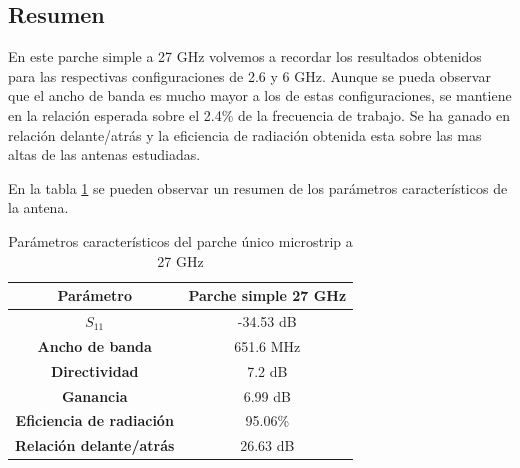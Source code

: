\subsection{Resumen}
\par En este parche simple a 27 GHz volvemos a recordar los resultados obtenidos para las respectivas configuraciones de 2.6 y 6 GHz. Aunque se pueda observar que el ancho de banda es mucho mayor a los de estas configuraciones, se mantiene en la relación esperada sobre el 2.4\% de la frecuencia de trabajo. Se ha ganado en relación delante/atrás y la eficiencia de radiación obtenida esta sobre las mas altas de las antenas estudiadas. 
\\
\par En la tabla \ref{tab:res1x13} se pueden observar un resumen de los parámetros característicos de la antena. 
\begin{table}[H]
  
  
   \small %
   \centering %
   \begin{tabular}{c c} %
   \toprule[\heavyrulewidth]\toprule[\heavyrulewidth]
   \textbf{Parámetro} & \textbf{Parche simple 27 GHz} \\ 
   \midrule
   \textbf{$S_{11}$} & -34.53 dB \\
   \textbf{Ancho de banda} & 651.6 MHz \\
   \textbf{Directividad} & 7.2 dB \\
   \textbf{Ganancia} & 6.99 dB \\
   \textbf{Eficiencia de radiación} & 95.06\% \\
   \textbf{Relación delante/atrás} & 26.63 dB \\

   \bottomrule[\heavyrulewidth] 
   \end{tabular}
   \caption{Parámetros característicos del parche único microstrip a 27 GHz} 
    \label{tab:res1x13}
\end{table}


































